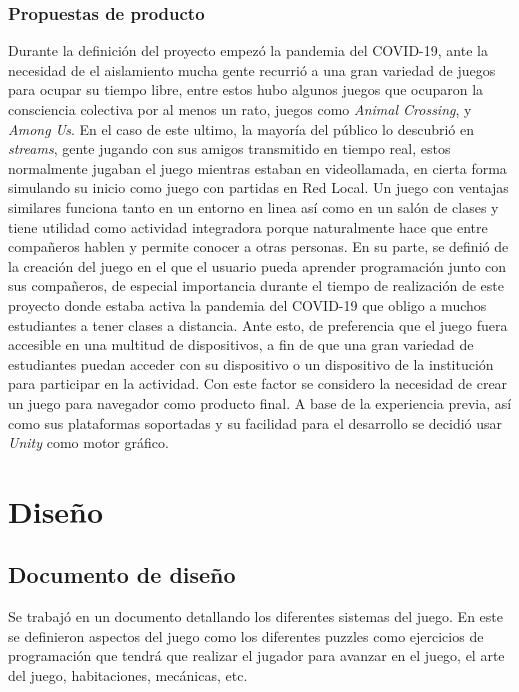 \subsubsection{Propuestas de producto}
Durante la definición del proyecto empezó la pandemia del COVID-19, ante la necesidad de el aislamiento mucha gente recurrió a una gran variedad de juegos para ocupar su tiempo libre, entre estos hubo algunos juegos que ocuparon la consciencia colectiva por al menos un rato, juegos como \textit{Animal Crossing},  y \textit{Among Us}. En el caso de este ultimo, la mayoría del público lo descubrió en \textit{streams}, gente jugando con sus amigos transmitido en tiempo real, estos normalmente jugaban el juego mientras estaban en videollamada, en cierta forma simulando su inicio como juego con partidas en Red Local. Un juego con ventajas similares funciona tanto en un entorno en linea así como en un salón de clases y tiene utilidad como actividad integradora porque naturalmente hace que entre compañeros hablen y permite conocer a otras personas.
En su parte, se definió de la creación del juego en el que el usuario pueda aprender programación junto con sus compañeros, de especial importancia durante el tiempo de realización de este proyecto donde estaba activa la pandemia del COVID-19 que obligo a muchos estudiantes a tener clases a distancia. Ante esto, de preferencia que el juego fuera accesible en una multitud de dispositivos, a fin de que una gran variedad de estudiantes puedan acceder con su dispositivo o un dispositivo de la institución para participar en la actividad. Con este factor se considero la necesidad de crear un juego para navegador como producto final. A base de la experiencia previa, así como sus plataformas soportadas y su facilidad para el desarrollo se decidió usar \textit{Unity} como motor gráfico.

\section{Diseño}
\subsection{Documento de diseño}
Se trabajó en un documento detallando los diferentes sistemas del juego. En este se definieron aspectos del juego como los diferentes puzzles como ejercicios de programación que tendrá que realizar el jugador para avanzar en el juego, el arte del juego, habitaciones, mecánicas, etc.

